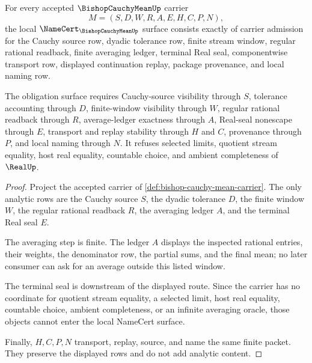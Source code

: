 \begin{theorem}
\label{thm:bishop-cauchy-mean-namecert-obligations}
For every accepted $\BishopCauchyMeanUp$ carrier
$$
M=(S,D,W,R,A,E,H,C,P,N),
$$
the local $\NameCert_{\BishopCauchyMeanUp}$ surface consists exactly of carrier admission for the Cauchy source row, dyadic tolerance row, finite stream window, regular rational readback, finite averaging ledger, terminal Real seal, componentwise transport row, displayed continuation replay, package provenance, and local naming row.

The obligation surface requires Cauchy-source visibility through $S$, tolerance accounting through $D$, finite-window visibility through $W$, regular rational readback through $R$, average-ledger exactness through $A$, Real-seal nonescape through $E$, transport and replay stability through $H$ and $C$, provenance through $P$, and local naming through $N$. It refuses selected limits, quotient stream equality, host real equality, countable choice, and ambient completeness of $\RealUp$.
\end{theorem}
\begin{proof}
Project the accepted carrier of \autoref{def:bishop-cauchy-mean-carrier}. The only analytic rows are the Cauchy source $S$, the dyadic tolerance $D$, the finite window $W$, the regular rational readback $R$, the averaging ledger $A$, and the terminal Real seal $E$.

The averaging step is finite. The ledger $A$ displays the inspected rational entries, their weights, the denominator row, the partial sums, and the final mean; no later consumer can ask for an average outside this listed window.

The terminal seal is downstream of the displayed route. Since the carrier has no coordinate for quotient stream equality, a selected limit, host real equality, countable choice, ambient completeness, or an infinite averaging oracle, those objects cannot enter the local NameCert surface.

Finally, $H,C,P,N$ transport, replay, source, and name the same finite packet. They preserve the displayed rows and do not add analytic content.
\end{proof}

